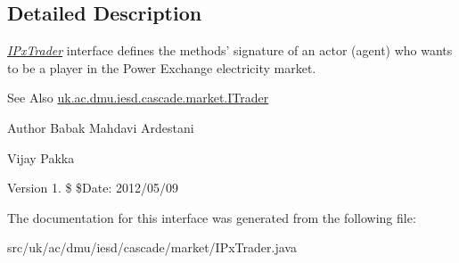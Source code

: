 \subsection{Detailed Description}
{\itshape \hyperlink{interfaceuk_1_1ac_1_1dmu_1_1iesd_1_1cascade_1_1market_1_1_i_px_trader}{I\-Px\-Trader}} interface defines the methods' signature of an actor (agent) who wants to be a player in the {\ttfamily Power Exchange} electricity market. 

\begin{DoxySeeAlso}{See Also}
\hyperlink{interfaceuk_1_1ac_1_1dmu_1_1iesd_1_1cascade_1_1market_1_1_i_trader}{uk.\-ac.\-dmu.\-iesd.\-cascade.\-market.\-I\-Trader}
\end{DoxySeeAlso}
\begin{DoxyAuthor}{Author}
Babak Mahdavi Ardestani 

Vijay Pakka 
\end{DoxyAuthor}
\begin{DoxyVersion}{Version}
1. \$ \$\-Date\-: 2012/05/09 
\end{DoxyVersion}


The documentation for this interface was generated from the following file\-:\begin{DoxyCompactItemize}
\item 
src/uk/ac/dmu/iesd/cascade/market/I\-Px\-Trader.\-java\end{DoxyCompactItemize}
